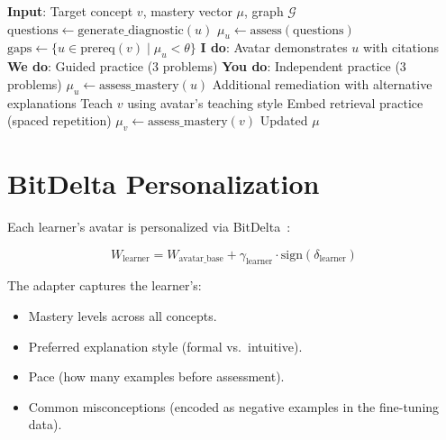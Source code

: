 \documentclass[11pt,letterpaper]{article}
\begin{document}
\begin{algorithm}[t]
\caption{Prerequisite-Aware Teaching Loop}
\label{alg:scaffold}
\begin{algorithmic}[1]
\STATE \textbf{Input}: Target concept $v$, mastery vector $\mu$, graph $\mathcal{G}$
\STATE {}
        \STATE $\text{questions} \leftarrow \text{generate\_diagnostic}(u)$
        \STATE $\mu_u \leftarrow \text{assess}(\text{questions})$
    \ENDIF
\ENDFOR
\STATE {}
\STATE $\text{gaps} \leftarrow \{u \in \text{prereq}(v) \mid \mu_u < \theta\}$
    \STATE \textbf{I do}: Avatar demonstrates $u$ with citations
    \STATE \textbf{We do}: Guided practice (3 problems)
    \STATE \textbf{You do}: Independent practice (3 problems)
    \STATE $\mu_u \leftarrow \text{assess\_mastery}(u)$
        \STATE Additional remediation with alternative explanations
    \ENDIF
\ENDFOR
\STATE {}
    \STATE Teach $v$ using avatar's teaching style
    \STATE Embed retrieval practice (spaced repetition)
    \STATE $\mu_v \leftarrow \text{assess\_mastery}(v)$
\ENDIF
\RETURN Updated $\mu$
\end{algorithmic}
\end{algorithm}

\section{BitDelta Personalization}

Each learner's avatar is personalized via BitDelta~\cite{liu2024bitdelta}:

\begin{equation}
W_{\text{learner}} = W_{\text{avatar\_base}} + \gamma_{\text{learner}} \cdot \text{sign}(\delta_{\text{learner}})
\end{equation}

The adapter captures the learner's:
\begin{itemize}
    \item Mastery levels across all concepts.
    \item Preferred explanation style (formal vs.\ intuitive).
    \item Pace (how many examples before assessment).
    \item Common misconceptions (encoded as negative examples in the fine-tuning data).
\end{itemize}
\end{document}
